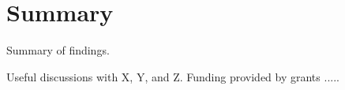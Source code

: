 \documentclass[agums]{aguplus}  %
\begin{document}
\section{Summary}
\label{summary.sec}

Summary of findings.

\begin{acknowledgments}
Useful discussions with X, Y, and Z.  
Funding provided by grants .....
\end{acknowledgments}


\end{document}
